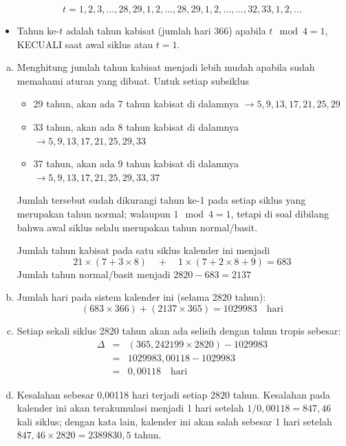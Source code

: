 \documentclass[11pt,fleqn]{exam}
\begin{document}
\begin{questions}
\begin{itemize}
$$t = 1, 2, 3, \ldots, 28, 29, 1, 2, \ldots, 28, 29, 1, 2, \ldots, \ldots, 32, 33, 1, 2, \ldots$$

\item Tahun ke-$t$ adalah tahun kabisat (jumlah hari 366) apabila $t \mod 4 = 1$, KECUALI saat awal siklus atau $t=1$.
\end{itemize}

\begin{enumerate}[(a)]
\item Menghitung jumlah tahun kabisat menjadi lebih mudah apabila sudah memahami aturan yang dibuat. Untuk setiap subsiklus
\begin{itemize}
\item 29 tahun, akan ada 7 tahun kabisat di dalamnya $\rightarrow 5, 9, 13, 17, 21, 25, 29$
\item 33 tahun, akan ada 8 tahun kabisat di dalamnya $\rightarrow 5, 9, 13, 17, 21, 25, 29, 33$
\item 37 tahun, akan ada 9 tahun kabisat di dalamnya $\rightarrow 5, 9, 13, 17, 21, 25, 29, 33, 37$
\end{itemize}
Jumlah tersebut sudah dikurangi tahun ke-1 pada setiap siklus yang merupakan tahun normal; walaupun $1 \mod 4 = 1$, tetapi di soal dibilang bahwa awal siklus selalu merupakan tahun normal/basit.

Jumlah tahun kabisat pada satu siklus kalender ini menjadi 
$$21 \times (7 + 3 \times 8) \quad + \quad 1 \times (7 + 2 \times 8 + 9) = 683$$
Jumlah tahun normal/basit menjadi $2820 - 683 = 2137$


\item Jumlah hari pada sistem kalender ini (selama 2820 tahun):
$$(683 \times 366) + (2137 \times 365) = 1029983 \quad \text{hari}$$

\item Setiap sekali siklus 2820 tahun akan ada selisih dengan tahun tropis sebesar:
\begin{eqnarray*}
\Delta &=& (365,242199 \times 2820) - 1029983 \\
&=& 1029983,00118 - 1029983 \\
&=& 0,00118 \quad \text{hari}
\end{eqnarray*}

\item Kesalahan sebesar 0,00118 hari terjadi setiap 2820 tahun. Kesalahan pada kalender ini akan terakumulasi menjadi 1 hari setelah $1/0,00118 = 847,46$ kali siklus; dengan kata lain, kalender ini akan salah sebesar 1 hari setelah $847,46 \times 2820 = 2389830,5$ tahun. 


\end{enumerate}
\end{questions}
\end{document}
